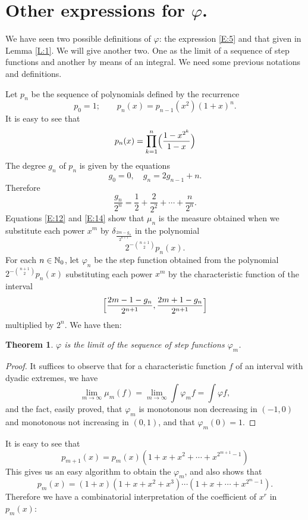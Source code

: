 \documentclass[10pt]{amsart}
\newtheorem{thm}{Theorem}
\theoremstyle{definition}
\theoremstyle{remark}
\begin{document}
\section{Other expressions for $\varphi$.}
We have seen two possible definitions of $\varphi$: the expression \eqref{E:5} and 
that given in Lemma \ref{L:1}. We will give another two. One as the limit of a sequence of
step functions and another by means of an integral. We need some previous notations and
definitions.

Let $p_n$ be the sequence of polynomials defined by the recurrence
\begin{equation}\label{E:14}
p_0=1;\qquad p_n(x)=p_{n-1}(x^2)(1+x)^n.
\end{equation}
It is easy to see that 
\begin{equation}\label{E:15}
p_n(x)=\prod_{k=1}^n\Bigl(\frac{1-x^{2^k}}{1-x}\Bigr)
\end{equation}
The degree $g_n$ of $p_n$ is given by the equations
\begin{equation}\label{E:16}
g_0=0,\quad g_n=2g_{n-1}+n.
\end{equation}
Therefore
\begin{equation}\label{E:17}
\frac{g_n}{2^n}=\frac12+\frac{2}{2^2}+\cdots+\frac{n}{2^n}.
\end{equation}
Equations \eqref{E:12} and \eqref{E:14} show that $\mu_n$ is the measure
obtained when we substitute each power $x^m$ by $\delta_{\frac{2m-g_n}{2^{n+1}}}$ in the polynomial
\[2^{-\binom{n+1}{2}}p_n(x).\]
For each $n\in\mathbb{N}_{0}$, let $\varphi_n$ be the step function obtained from
the polynomial $2^{-\binom{n+1}{2}}p_n(x)$ substituting each power $x^m$ by the characteristic
function of the interval 
\[ \Bigl[\frac{2m-1-g_n}{2^{n+1}},\frac{2m+1-g_n}{2^{n+1}}\Bigr]\]
multiplied by $2^n$. We have then:
\begin{thm}\label{T:2}
$\varphi$ is the limit of the sequence of step functions $\varphi_m$.
\end{thm}
\begin{proof}
It suffices to observe that for a characteristic function $f$ of an interval with dyadic 
extremes, we have
\[\lim_{m\to\infty}\mu_m(f)=\lim_{m\to\infty}\int\varphi_m f=\int\varphi f,\]
and the fact, easily proved, that $\varphi_m$ is monotonous non decreasing in $(-1,0)$
and monotonous not increasing in $(0,1)$, and that $\varphi_m(0)=1$. 
\end{proof}

It is easy to see that 
\begin{equation}\label{E:18}
p_{m+1}(x)=p_m(x)(1+x+x^2+\cdots+x^{2^{m+1}-1})
\end{equation}
This gives us an easy algorithm to obtain the $\varphi_m$, and also shows that
\begin{equation}\label{E:19}
p_{m}(x)=(1+x)(1+x+x^2+x^3)\cdots(1+x+\cdots+x^{2^m-1}).
\end{equation}
Therefore we have a combinatorial interpretation  of the coefficient of $x^r$ in $p_m(x)$:
\end{document}
